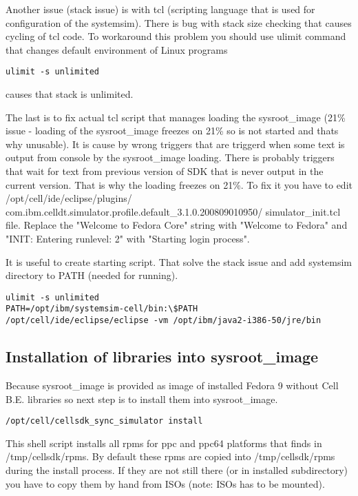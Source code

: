 \par
Another issue (stack issue) is with tcl (scripting language that is used for configuration of the systemsim).
There is bug with stack size checking that causes cycling of tcl code.
To workaround this problem you should use ulimit command that changes default environment of Linux programs

\begin{verbatim}
ulimit -s unlimited
\end{verbatim}

causes that stack is unlimited.

\par
The last is to fix actual tcl script that manages loading the sysroot\_image (21\% issue - loading of the sysroot\_image freezes on 21\% so is not started and thats why unusable).
It is cause by wrong triggers that are triggerd when some text is output from console by the sysroot\_image loading.
There is probably triggers that wait for text from previous version of SDK that is never output in the current version.
That is why the loading freezes on 21\%.
To fix it you have to edit /opt/cell/ide/eclipse/plugins/ com.ibm.celldt.simulator.profile.default\_3.1.0.200809010950/ simulator\_init.tcl file.
Replace the "Welcome to Fedora Core" string with "Welcome to Fedora" and "INIT: Entering runlevel: 2" with "Starting login process".

It is useful to create starting script. That solve the stack issue and add systemsim directory to PATH (needed for running).

\begin{verbatim}
ulimit -s unlimited
PATH=/opt/ibm/systemsim-cell/bin:\$PATH
/opt/cell/ide/eclipse/eclipse -vm /opt/ibm/java2-i386-50/jre/bin
\end{verbatim}

\subsection{Installation of libraries into sysroot\_image}

Because sysroot\_image is provided as image of installed Fedora 9 without Cell B.E. libraries so next step is to install them into sysroot\_image.

\begin{verbatim}
/opt/cell/cellsdk_sync_simulator install
\end{verbatim}

This shell script installs all rpms for ppc and ppc64 platforms that finds in /tmp/cellsdk/rpms.
By default these rpms are copied into /tmp/cellsdk/rpms during the install process.
If they are not still there (or in installed subdirectory) you have to copy them by hand from ISOs (note: ISOs has to be mounted).

